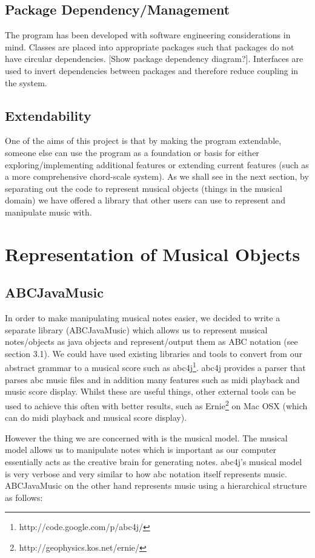 \documentclass[pdftex,12pt,a4paper]{report}
\begin{document}
\subsection{Package Dependency/Management}
The program has been developed with software engineering considerations in mind. Classes are placed into appropriate packages such that packages do not have circular dependencies. [Show package dependency diagram?]. Interfaces are used to invert dependencies between packages and therefore reduce coupling in the system. 

\subsection{Extendability}
One of the aims of this project is that by making the program extendable, someone else can use the program as a foundation or basis for either exploring/implementing additional features or extending current features (such as a more comprehensive chord-scale system). As we shall see in the next section, by separating out the code to represent musical objects (things in the musical domain) we have offered a library that other users can use to represent and manipulate music with.

\section{Representation of Musical Objects}

\subsection{ABCJavaMusic}
In order to make manipulating musical notes easier, we decided to write a separate library (ABCJavaMusic) which allows us to represent musical notes/objects as java objects and represent/output them as ABC notation (see section 3.1). We could have used existing libraries and tools to convert from our abstract grammar to a musical score such as abc4j\footnote{http://code.google.com/p/abc4j/}. abc4j provides a parser that parses abc music files and in addition many features such as midi playback and music score display. Whilst these are useful things, other external tools can be used to achieve this often with better results, such as Ernie\footnote{http://geophysics.kos.net/ernie/} on Mac OSX (which can do midi playback and musical score display).

However the thing we are concerned with is the musical model. The musical model allows us to manipulate notes which is important as our computer essentially acts as the creative brain for generating notes. abc4j's musical model is very verbose and very similar to how abc notation itself represents music. 
ABCJavaMusic on the other hand represents music using a hierarchical structure as follows:
\end{document}

